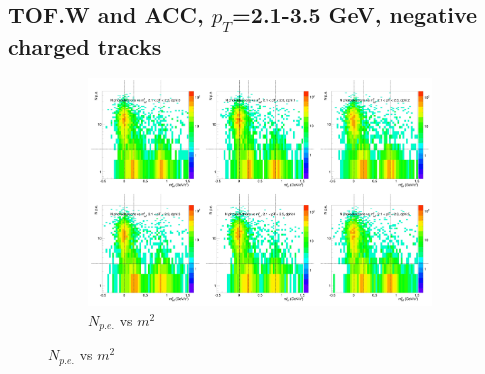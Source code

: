 \subsection{TOF.W and ACC, $p_T$=2.1-3.5 GeV, negative charged tracks}
\label{app:accdata}
\begin{figure}[H]
  \centering
    \begin{subfigure}{1\textwidth}
    \includegraphics[width=1\textwidth]{hiptfits/neg/PSaccthreshold_cent0_ich0_accfire0_ptbin8.jpg}
    \caption{$N_{p.e.}$ vs $m^2$}
    \end{subfigure}
\end{figure}
